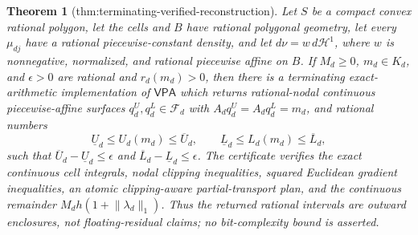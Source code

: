 \documentclass{article}
\newtheorem{theorem}{Theorem}
\begin{document}
\begin{theorem}[thm:terminating-verified-reconstruction]\label{thm:terminating-verified-reconstruction}
Let \(S\) be a compact convex rational polygon, let the cells and \(B\) have
rational polygonal geometry, let every \(\mu_{dj}\) have a rational
piecewise-constant density, and let \(d\nu=w\,d\mathcal H^1\), where \(w\) is
nonnegative, normalized, and rational piecewise affine on \(B\).  If \(M_d\geq0\),
\(m_d\in K_d\), and \(\epsilon>0\) are rational and \(r_d(m_d)>0\), then there is
a terminating exact-arithmetic implementation of \(\mathsf{VPA}\) which returns
rational-nodal continuous piecewise-affine surfaces
\(q_d^U,q_d^L\in\mathcal F_d\) with \(A_dq_d^U=A_dq_d^L=m_d\), and rational
numbers
\[
 \underline U_d\leq U_d(m_d)\leq\overline U_d,
 \qquad
 \underline L_d\leq L_d(m_d)\leq\overline L_d,
\]
such that \(\overline U_d-\underline U_d\leq\epsilon\) and
\(\overline L_d-\underline L_d\leq\epsilon\).  The certificate verifies the
exact continuous cell integrals, nodal clipping inequalities, squared Euclidean
gradient inequalities, an atomic clipping-aware partial-transport plan, and the
continuous remainder \(M_dh(1+\lVert\lambda_d\rVert_1)\).  Thus the returned
rational intervals are outward enclosures, not floating-residual claims; no
bit-complexity bound is asserted.
\end{theorem}
\end{document}
